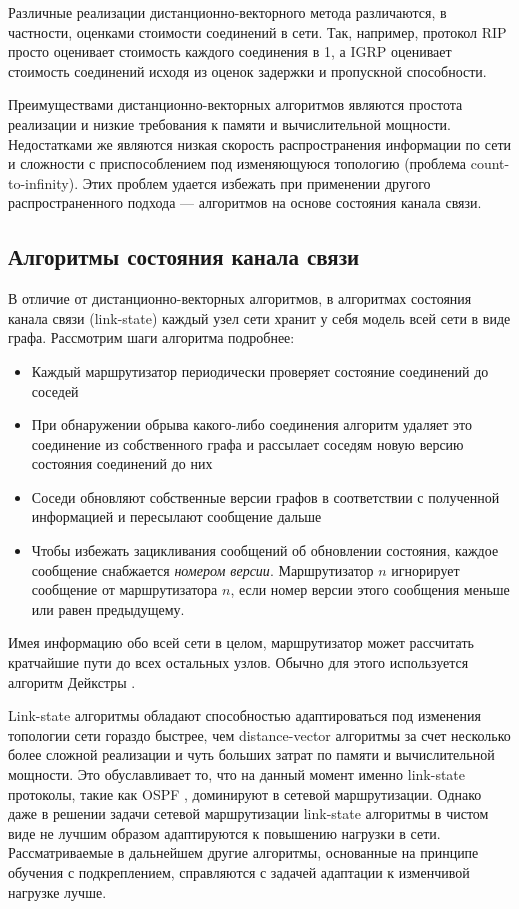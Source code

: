 \documentclass[specification,annotation,times]{itmo-student-thesis}
\theoremstyle{definition}
\begin{document}
Различные реализации дистанционно-векторного метода различаются, в частности,
оценками стоимости соединений в сети. Так, например, протокол RIP \cite{rip-rfc} просто
оценивает стоимость каждого соединения в 1, а IGRP \cite{igrp-patent} оценивает
стоимость соединений исходя из оценок задержки и пропускной способности.

Преимуществами дистанционно-векторных алгоритмов являются простота реализации и
низкие требования к памяти и вычислительной мощности. Недостатками же являются
низкая скорость распространения информации по сети и сложности с приспособлением
под изменяющуюся топологию (проблема count-to-infinity). Этих проблем
удается избежать при применении другого распространенного подхода --- алгоритмов
на основе состояния канала связи. 

\subsection{Алгоритмы состояния канала связи}

В отличие от дистанционно-векторных алгоритмов, в алгоритмах состояния канала связи
(link-state) каждый узел сети хранит у себя модель всей сети в виде графа.
Рассмотрим шаги алгоритма подробнее:

\begin{itemize}
\item Каждый маршрутизатор периодически проверяет состояние соединений до
  соседей
\item При обнаружении обрыва какого-либо соединения алгоритм удаляет это
  соединение из собственного графа и рассылает соседям новую версию состояния
  соединений до них
\item Соседи обновляют собственные версии графов в соответствии с полученной
  информацией и пересылают сообщение дальше
\item Чтобы избежать зацикливания сообщений об обновлении состояния, каждое
  сообщение снабжается \textit{номером версии}. Маршрутизатор $n$ игнорирует
  сообщение от маршрутизатора $n$, если номер версии этого сообщения меньше или
  равен предыдущему.
\end{itemize}

Имея информацию обо всей сети в целом, маршрутизатор может рассчитать кратчайшие
пути до всех остальных узлов. Обычно для этого используется алгоритм
Дейкстры \cite{dijkstra}. 

Link-state алгоритмы обладают способностью адаптироваться под изменения
топологии сети гораздо быстрее, чем distance-vector алгоритмы за счет
несколько более сложной реализации и чуть больших затрат по памяти и
вычислительной мощности. Это обуславливает то, что на данный момент именно
link-state протоколы, такие как OSPF \cite{ospf-rfc}, доминируют в сетевой
маршрутизации. Однако даже в решении задачи сетевой маршрутизации link-state
алгоритмы в чистом виде не лучшим образом адаптируются к повышению нагрузки в
сети. Рассматриваемые в дальнейшем другие алгоритмы, основанные на принципе
обучения с подкреплением, справляются с задачей адаптации к
изменчивой нагрузке лучше.
\end{document}
